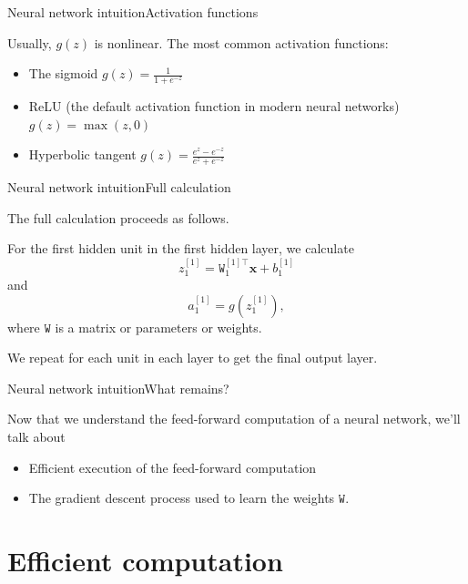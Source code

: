 \documentclass{beamer}
\renewcommand{\vec}[1]{\boldsymbol{#1}}
\newcommand{\mat}[1]{\mathtt{#1}}
\begin{document}
\begin{frame}{Neural network intuition}{Activation functions}

  Usually, $g(z)$ is nonlinear. The most common activation functions:
  \begin{itemize}
  \item The sigmoid $g(z) = \frac{1}{1+e^{-z}}$
  \item ReLU (the default activation function in modern neural
    networks) $g(z) = \max(z,0)$
  \item Hyperbolic tangent $g(z) = \frac{e^z-e^{-z}}{e^z+e^{-z}}$
  \end{itemize}

\end{frame}


\begin{frame}{Neural network intuition}{Full calculation}

  The full calculation proceeds as follows.

  \medskip

  For the first hidden unit in the
  first hidden layer, we calculate
  \[ z_1^{[1]} = \mat{W}_1^{[1]\top}\vec{x} + b_1^{[1]} \]
  and
  \[ a_1^{[1]} = g(z_1^{[1]}), \]
  where $\mat{W}$ is a matrix or parameters or weights.

  \medskip

  We repeat for each unit in each layer to get the final output
  layer.

\end{frame}


\begin{frame}{Neural network intuition}{What remains?}

  Now that we understand the feed-forward computation of a neural network,
  we'll talk about
  \begin{itemize}
  \item \alert{Efficient execution} of the feed-forward computation
  \item The \alert{gradient descent process} used to learn the weights
    $\mat{W}$.
  \end{itemize}
  
\end{frame}

\section{Efficient computation}
\end{document}
